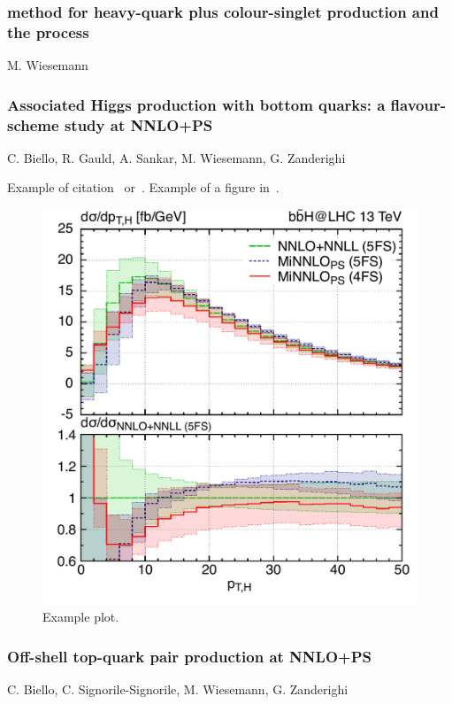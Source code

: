\documentclass{FBR_Bericht_2025}
\begin{document}
\begin{refsection}
%
\subsubsection[\minnlo{} method for heavy-quark plus colour-singlet production and application to $b\bar{b}Z$ process]{\minnlo{} method for heavy-quark plus colour-singlet production and the  process}
\begin{Namen}
M. Wiesemann
\end{Namen}
%
\subsubsection{Associated Higgs production with bottom quarks: a flavour-scheme study at NNLO+PS}
\begin{Namen}
C. Biello, R. Gauld, A. Sankar, M. Wiesemann, G. Zanderighi
\end{Namen}
Example of citation~\cite{Biello:2024pgo} or~.
Example of a figure in~.
\begin{figure}[phtb]
\begin{center}
\includegraphics[width=0.95\linewidth]{plots/bbH__ptHspectrum.pdf}
\caption{Example plot.}
\label{phenofig:bbH}
\end{center}
\end{figure}
%
\subsubsection{Off-shell top-quark pair production at NNLO+PS}
\begin{Namen}
C. Biello, C. Signorile-Signorile, M. Wiesemann, G. Zanderighi
\end{Namen}
%

\end{refsection}
\end{document}
